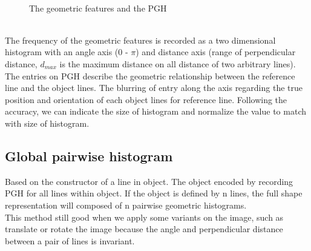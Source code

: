 \begin{figure}[h!]
\centering
{}~~
\caption{The geometric features and the PGH}
\label{fig:figure_31}
\end{figure}
\\[0.3cm]The frequency of the geometric features is recorded as a two dimensional histogram with an angle axis (0 - $\pi$) and distance axis (range of perpendicular distance, $d_{max}$ is the maximum distance on all distance of two arbitrary lines). The entries on PGH describe the geometric relationship between the reference line and the object lines. The blurring of entry along the axis regarding the true position and orientation of each object lines for reference line. Following the accuracy, we can indicate the size of histogram and normalize the value to match with size of histogram.
\subsection{Global pairwise histogram}
Based on the constructor of a line in object. The object encoded by recording PGH for all lines within object. If the object is defined by n lines, the full shape representation will composed of n pairwise geometric histograms.\\
This method still good when we apply some variants on the image, such as translate or rotate the image because the angle and perpendicular distance between a pair of lines is invariant.
